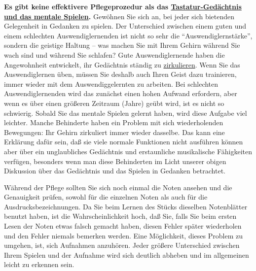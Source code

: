 \textbf{Es gibt keine effektivere Pflegeprozedur als das \hyperref[c1iii6tastatur]{Tastatur-Gedächtnis und das mentale Spielen}.}
Gewöhnen Sie sich an, bei jeder sich bietenden Gelegenheit in Gedanken zu spielen.
Der Unterschied zwischen einem guten und einem schlechten Auswendiglernenden ist nicht so sehr die \enquote{Auswendiglernstärke}, sondern die geistige Haltung -- was machen Sie mit Ihrem Gehirn während Sie wach sind und während Sie schlafen?
Gute Auswendiglernende haben die Angewohnheit entwickelt, ihr Gedächtnis ständig zu \hyperref[c1iii2]{zirkulieren}.
Wenn Sie das Auswendiglernen üben, müssen Sie deshalb auch Ihren Geist dazu trainieren, immer wieder mit dem Auswendiggelernten zu arbeiten.
Bei schlechten Auswendiglernenden wird das zunächst einen hohen Aufwand erfordern, aber wenn es über einen größeren Zeitraum (Jahre) geübt wird, ist es nicht so schwierig.
Sobald Sie das mentale Spielen gelernt haben, wird diese Aufgabe viel leichter.
Manche Behinderte haben ein Problem mit sich wiederholenden Bewegungen: Ihr Gehirn zirkuliert immer wieder dasselbe.
Das kann eine Erklärung dafür sein, daß sie viele normale Funktionen nicht ausführen können aber über ein unglaubliches Gedächtnis und erstaunliche musikalische Fähigkeiten verfügen, besonders wenn man diese Behinderten im Licht unserer obigen Diskussion über das Gedächtnis und das Spielen in Gedanken betrachtet.

Während der Pflege sollten Sie sich noch einmal die Noten ansehen und die Genauigkeit prüfen, sowohl für die einzelnen Noten als auch für die Ausdrucksbezeichnungen.
Da Sie beim Lernen des Stücks dieselben Notenblätter benutzt haben, ist die Wahrscheinlichkeit hoch, daß Sie, falls Sie beim ersten Lesen der Noten etwas falsch gemacht haben, diesen Fehler später wiederholen und den Fehler niemals bemerken werden. 
Eine Möglichkeit, dieses Problem zu umgehen, ist, sich Aufnahmen anzuhören.
Jeder größere Unterschied zwischen Ihrem Spielen und der Aufnahme wird sich deutlich abheben und im allgemeinen leicht zu erkennen sein.

